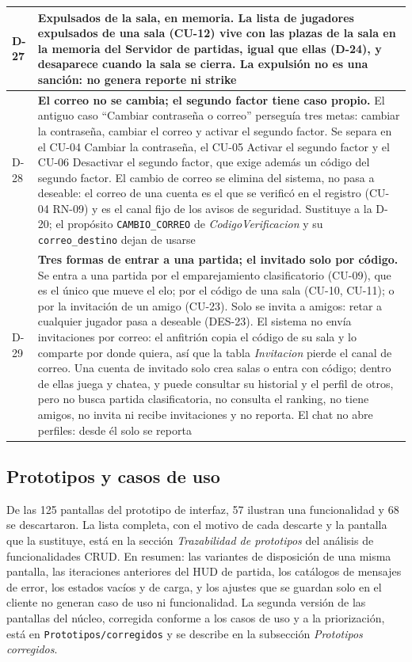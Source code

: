 \begin{center}
\begin{longtable}{|L{0.082\textwidth}|L{0.818\textwidth}|}
\mbox{D-27} & \textbf{Expulsados de la sala, en memoria.} La lista de jugadores expulsados de una sala (\mbox{CU-12}) vive con las plazas de la sala en la memoria del Servidor de partidas, igual que ellas (\mbox{D-24}), y desaparece cuando la sala se cierra. La expulsión no es una sanción: no genera reporte ni strike \\ \hline
\mbox{D-28} & \textbf{El correo no se cambia; el segundo factor tiene caso propio.} El antiguo caso ``Cambiar contraseña o correo'' perseguía tres metas: cambiar la contraseña, cambiar el correo y activar el segundo factor. Se separa en el \mbox{CU-04} Cambiar la contraseña, el \mbox{CU-05} Activar el segundo factor y el \mbox{CU-06} Desactivar el segundo factor, que exige además un código del segundo factor. El cambio de correo se elimina del sistema, no pasa a deseable: el correo de una cuenta es el que se verificó en el registro (\mbox{CU-04} \mbox{RN-09}) y es el canal fijo de los avisos de seguridad. Sustituye a la \mbox{D-20}; el propósito \texttt{CAMBIO\_\allowbreak{}CORREO} de \textit{CodigoVerificacion} y su \texttt{correo\_\allowbreak{}destino} dejan de usarse \\ \hline
\mbox{D-29} & \textbf{Tres formas de entrar a una partida; el invitado solo por código.} Se entra a una partida por el emparejamiento clasificatorio (\mbox{CU-09}), que es el único que mueve el elo; por el código de una sala (\mbox{CU-10}, \mbox{CU-11}); o por la invitación de un amigo (\mbox{CU-23}). Solo se invita a amigos: retar a cualquier jugador pasa a deseable (\mbox{DES-23}). El sistema no envía invitaciones por correo: el anfitrión copia el código de su sala y lo comparte por donde quiera, así que la tabla \textit{Invitacion} pierde el canal de correo. Una cuenta de invitado solo crea salas o entra con código; dentro de ellas juega y chatea, y puede consultar su historial y el perfil de otros, pero no busca partida clasificatoria, no consulta el ranking, no tiene amigos, no invita ni recibe invitaciones y no reporta. El chat no abre perfiles: desde él solo se reporta \\ \hline
\end{longtable}
\end{center}

\subsection*{Prototipos y casos de uso}
De las 125 pantallas del prototipo de interfaz, 57 ilustran una funcionalidad y 68 se descartaron. La lista completa, con el motivo de cada descarte y la pantalla que la sustituye, está en la sección \textit{Trazabilidad de prototipos} del análisis de funcionalidades CRUD. En resumen: las variantes de disposición de una misma pantalla, las iteraciones anteriores del HUD de partida, los catálogos de mensajes de error, los estados vacíos y de carga, y los ajustes que se guardan solo en el cliente no generan caso de uso ni funcionalidad. La segunda versión de las pantallas del núcleo, corregida conforme a los casos de uso y a la priorización, está en \texttt{Prototipos/corregidos} y se describe en la subsección \textit{Prototipos corregidos}.
